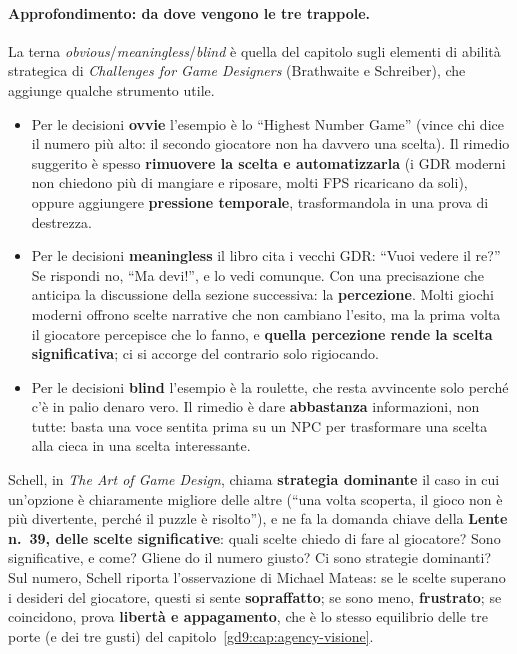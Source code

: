\paragraph{Approfondimento: da dove vengono le tre trappole.} La terna
\emph{obvious}/\emph{meaningless}/\emph{blind} è quella del capitolo sugli
elementi di abilità strategica di \emph{Challenges for Game Designers}
(Brathwaite e Schreiber), che aggiunge qualche strumento utile.
\begin{itemize}
  \item Per le decisioni \textbf{ovvie} l'esempio è lo ``Highest Number
        Game'' (vince chi dice il numero più alto: il secondo giocatore non
        ha davvero una scelta). Il rimedio suggerito è spesso
        \textbf{rimuovere la scelta e automatizzarla} (i GDR moderni non
        chiedono più di mangiare e riposare, molti FPS ricaricano da soli),
        oppure aggiungere \textbf{pressione temporale}, trasformandola in una
        prova di destrezza.
  \item Per le decisioni \textbf{meaningless} il libro cita i vecchi GDR:
        ``Vuoi vedere il re?'' Se rispondi no, ``Ma devi!'', e lo vedi
        comunque. Con una precisazione che anticipa la discussione della
        sezione successiva: la \textbf{percezione}. Molti giochi moderni
        offrono scelte narrative che non cambiano l'esito, ma la prima
        volta il giocatore percepisce che lo fanno, e \textbf{quella
        percezione rende la scelta significativa}; ci si accorge del
        contrario solo rigiocando.
  \item Per le decisioni \textbf{blind} l'esempio è la roulette, che resta
        avvincente solo perché c'è in palio denaro vero. Il rimedio è dare
        \textbf{abbastanza} informazioni, non tutte: basta una voce
        sentita prima su un NPC per trasformare una scelta alla cieca in una
        scelta interessante.
\end{itemize}
Schell, in \emph{The Art of Game Design}, chiama \textbf{strategia
dominante} il caso in cui un'opzione è chiaramente migliore delle altre
(``una volta scoperta, il gioco non è più divertente, perché il puzzle è
risolto''), e ne fa la domanda chiave della \textbf{Lente n.~39, delle
scelte significative}: quali scelte chiedo di fare al giocatore? Sono
significative, e come? Gliene do il numero giusto? Ci sono strategie
dominanti? Sul numero, Schell riporta l'osservazione di Michael Mateas:
se le scelte superano i desideri del giocatore, questi si sente
\textbf{sopraffatto}; se sono meno, \textbf{frustrato}; se coincidono, prova
\textbf{libertà e appagamento}, che è lo stesso equilibrio delle tre porte
(e dei tre gusti) del capitolo~\ref{gd9:cap:agency-visione}.

